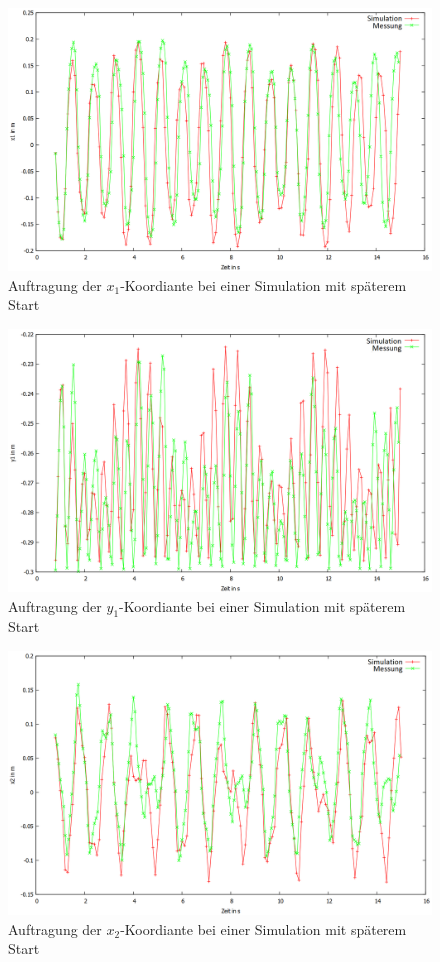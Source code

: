 \begin{figure}
        \includegraphics[width=.9\textwidth]{images/x1_ueber_t_neu.png}
\caption{Auftragung der $x_1$-Koordiante bei einer Simulation mit späterem Start}
\label{x1_ueber_t}
\end{figure}

\begin{figure}
        \includegraphics[width=.9\textwidth]{images/y1_ueber_t_neu.png}
\caption{Auftragung der $y_1$-Koordiante bei einer Simulation mit späterem Start}
\label{y1_ueber_t}
\end{figure}

\begin{figure}
        \includegraphics[width=.9\textwidth]{images/x2_ueber_t_neu.png}
\caption{Auftragung der $x_2$-Koordiante bei einer Simulation mit späterem Start}
\label{x2_ueber_t}
\end{figure}

